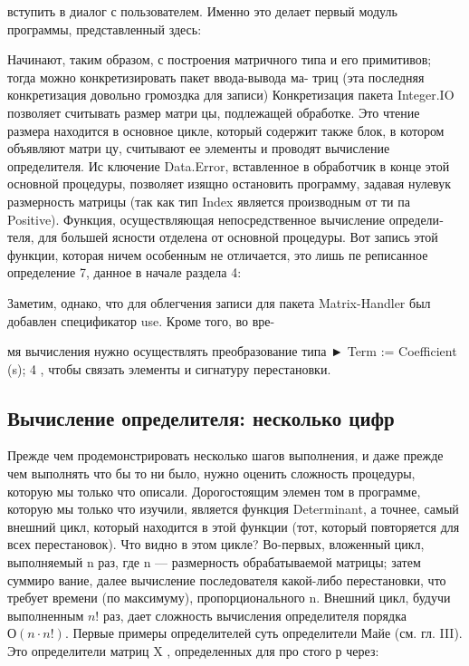 \documentclass{../../template/mai_book}
\begin{document}
\newpage

вступить в диалог с пользователем. Именно это делает первый модуль
программы, представленный здесь:


Начинают, таким образом, с построения матричного типа и его
примитивов; тогда можно конкретизировать пакет ввода-вывода ма-
\newpage
триц (эта последняя конкретизация довольно громоздка для записи)
Конкретизация пакета Integer.IO позволяет считывать размер матри­
цы, подлежащей обработке. Это чтение размера находится в основное
цикле, который содержит также блок, в котором объявляют матри­
цу, считывают ее элементы и проводят вычисление определителя. Ис­
ключение Data.Error, вставленное в обработчик в конце этой основной
процедуры, позволяет изящно остановить программу, задавая нулевук
размерность матрицы (так как тип Index является производным от ти­
па Positive).
Функция, осуществляющая непосредственное вычисление определи­
теля, для большей ясности отделена от основной процедуры. Вот запись
этой функции, которая ничем особенным не отличается, это лишь пе­
реписанное определение 7, данное в начале раздела 4:


Заметим, однако, что для облегчения записи для пакета
Matrix-Handler был добавлен спецификатор use. Кроме того, во вре-
\newpage

мя вычисления нужно осуществлять преобразование типа ► Term :=
Coefficient (s); 4 , чтобы связать элементы и сигнатуру перестановки.

\subsection{Вычисление определителя: несколько цифр}

Прежде чем продемонстрировать несколько шагов выполнения, и даже
прежде чем выполнять что бы то ни было, нужно оценить сложность
процедуры, которую мы только что описали. Дорогостоящим элемен­
том в программе, которую мы только что изучили, является функция
Determinant, а точнее, самый внешний цикл, который находится в этой
функции (тот, который повторяется для всех перестановок).
Что видно в этом цикле? Во-первых, вложенный цикл, выполняемый
n раз, где n — размерность обрабатываемой матрицы; затем суммиро­
вание, далее вычисление последователя какой-либо перестановки, что
требует времени (по максимуму), пропорционального n. Внешний цикл,
будучи выполненным $n!$ раз, дает сложность вычисления определителя
порядка $О(n \cdot n!)$. Первые примеры определителей суть определители
Майе (см. гл. III). Это определители матриц X , определенных для про­
стого р через:
\end{document}
